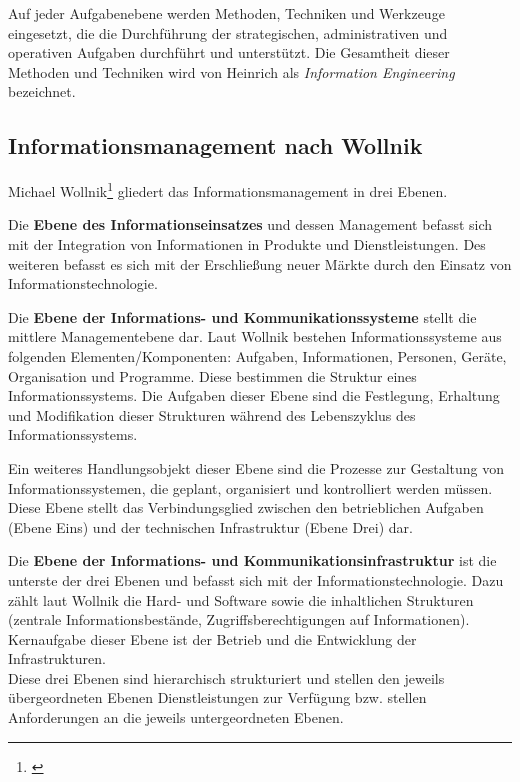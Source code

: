 Auf jeder Aufgabenebene werden Methoden, Techniken und Werkzeuge eingesetzt, die die Durchführung 
der strategischen, administrativen und operativen Aufgaben durchführt und unterstützt.
Die Gesamtheit dieser Methoden und Techniken wird von Heinrich als \emph{Information Engineering} bezeichnet.

\subsection{Informationsmanagement nach Wollnik}
Michael Wollnik\footnote{\cite{wollnik_referenzmodell_1988}} gliedert das Informationsmanagement in drei Ebenen.

Die \textbf{Ebene des Informationseinsatzes} und dessen Management befasst sich mit der Integration von Informationen in Produkte und Dienstleistungen. Des weiteren befasst es sich mit der Erschließung neuer Märkte durch den Einsatz von Informationstechnologie.

Die \textbf{Ebene der Informations- und Kommunikationssysteme} stellt die mittlere Managementebene dar. Laut Wollnik bestehen Informationssysteme aus folgenden Elementen/Komponenten: Aufgaben, Informationen, Personen, Geräte, Organisation und Programme. Diese bestimmen die Struktur eines Informationssystems. Die Aufgaben dieser Ebene sind die Festlegung, Erhaltung und Modifikation dieser Strukturen während des Lebenszyklus des Informationssystems.

Ein weiteres Handlungsobjekt dieser Ebene sind die Prozesse zur Gestaltung von Informationssystemen, die geplant, organisiert und kontrolliert werden müssen. Diese Ebene stellt das Verbindungsglied zwischen den betrieblichen Aufgaben (Ebene Eins) und der technischen Infrastruktur (Ebene Drei) dar.

Die \textbf{Ebene der Informations- und Kommunikationsinfrastruktur} ist die unterste der drei Ebenen 
und befasst sich mit der Informationstechnologie. 
Dazu zählt laut Wollnik die Hard- und Software sowie die inhaltlichen Strukturen (zentrale Informationsbestände, Zugriffsberechtigungen auf Informationen). Kernaufgabe dieser Ebene ist der Betrieb und die Entwicklung der Infrastrukturen.\\

Diese drei Ebenen sind hierarchisch strukturiert und stellen den jeweils übergeordneten Ebenen Dienstleistungen zur Verfügung bzw. stellen Anforderungen an die jeweils untergeordneten Ebenen. 

